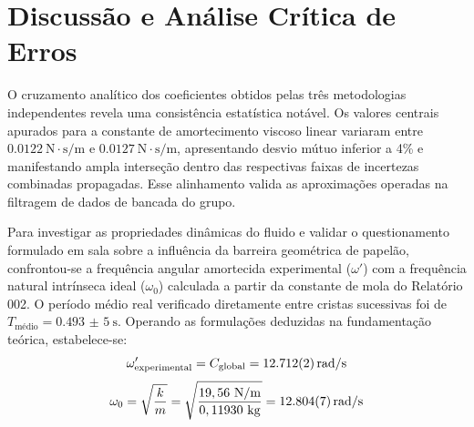 \documentclass[12pt, a4paper]{article}
\begin{document}
%

\section{Discussão e Análise Crítica de Erros}

O cruzamento analítico dos coeficientes obtidos pelas três metodologias independentes revela uma consistência estatística notável. Os valores centrais apurados para a constante de amortecimento viscoso linear variaram entre $\SI{0,0122}{\newton\cdot\second/\meter}$ e $\SI{0,0127}{\newton\cdot\second/\meter}$, apresentando desvio mútuo inferior a 4\% e manifestando ampla interseção dentro das respectivas faixas de incertezas combinadas propagadas. Esse alinhamento valida as aproximações operadas na filtragem de dados de bancada do grupo.

Para investigar as propriedades dinâmicas do fluido e validar o questionamento formulado em sala sobre a influência da barreira geométrica de papelão, confrontou-se a frequência angular amortecida experimental ($\omega'$) com a frequência natural intrínseca ideal ($\omega_0$) calculada a partir da constante de mola do Relatório 002. O período médio real verificado diretamente entre cristas sucessivas foi de $T_{\text{médio}} = \SI{0,493(5)}{\second}$. Operando as formulações deduzidas na fundamentação teórica, estabelece-se:
\begin{equation}
    \omega_{\text{experimental}}' = C_{\text{global}} = \SI{12,712 \pm 0,002}{\text{rad}/\second}
\end{equation}
\begin{equation}
    \omega_0 = \sqrt{\frac{k}{m}} = \sqrt{\frac{19,56\text{ N/m}}{0,11930\text{ kg}}} = \SI{12,804 \pm 0,007}{\text{rad}/\second}
\end{equation}
\end{document}
